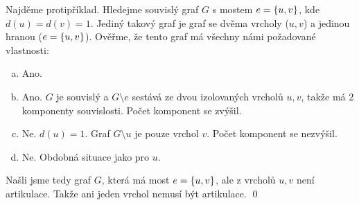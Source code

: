 \documentclass[11pt,a4paper]{article}
\begin{document}
\begin{solution}

Najděme protipříklad. Hledejme souvislý graf $G$ s mostem $e = \left\lbrace u,v \right\rbrace$, kde $d(u)=d(v)=1$. 
Jediný takový graf je graf se dvěma vrcholy ($u,v$) a jedinou hranou ($e=\left\lbrace u,v \right\rbrace$).
Ověřme, že tento graf má všechny námi požadované vlastnosti:
\begin{enumerate}[a), noitemsep]
    \item {} Ano.
    \item {} Ano. $G$ je souvislý a $G \setminus e$ sestává ze dvou izolovaných vrcholů $u,v$, 
    takže má 2 komponenty souvislosti. Počet komponent se zvýšil.
    \item {} Ne. $d(u)=1$. Graf $G \setminus u$ je pouze vrchol $v$. Počet komponent se nezvýšil.
    \item {} Ne. Obdobná situace jako pro $u$.
\end{enumerate}
Našli jsme tedy graf $G$, která má most $e = \left\lbrace u,v \right\rbrace$, ale  z vrcholů $u,v$ není artikulace. Takže ani 
jeden vrchol nemusí být artikulace.
\hspace{\fill}\qed
\end{solution}
\end{document}
